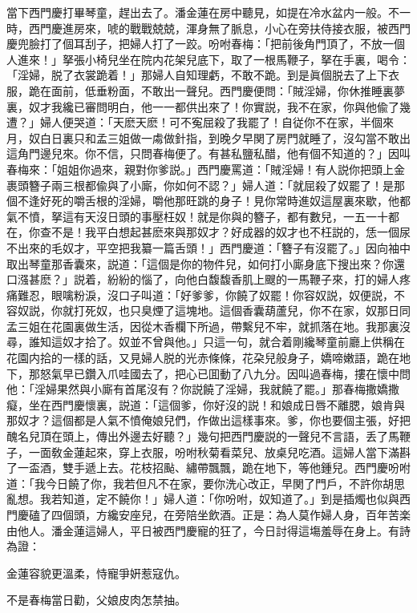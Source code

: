 當下西門慶打畢琴童，趕出去了。潘金蓮在房中聽見，如提在冷水盆内一般。不一時，西門慶進房來，唬的戰戰兢兢，渾身無了脈息，小心在旁扶侍接衣服，被西門慶兜臉打了個耳刮子，把婦人打了一跤。吩咐春梅：「把前後角門頂了，不放一個人進來！」拏張小椅兒坐在院内花架兒底下，取了一根馬鞭子，拏在手裏，喝令：「淫婦，脱了衣裳跪着！」那婦人自知理虧，不敢不跪。到是眞個脱去了上下衣服，跪在面前，低垂粉面，不敢出一聲兒。西門慶便問：「賊淫婦，你休推睡裏夢裏，奴才我纔已審問明白，他一一都供出來了！你實説，我不在家，你與他偸了幾遭？」婦人便哭道：「天麽天麽！可不寃屈殺了我罷了！自従你不在家，半個來月，奴白日裏只和孟三姐做一䖏做針指，到晚夕早関了房門就睡了，沒勾當不敢出這角門邊兒來。你不信，只問春梅便了。有甚私鹽私醋，他有個不知道的？」因叫春梅來：「姐姐你過來，親對你爹説。」西門慶罵道：「賊淫婦！有人説你把頭上金裹頭簪子兩三根都偸與了小廝，你如何不認？」婦人道：「就屈殺了奴罷了！是那個不逢好死的嚼舌根的淫婦，嚼他那旺跳的身子！見你常時進奴這屋裏來歇，他都氣不憤，拏這有天沒日頭的事壓枉奴！就是你與的簪子，都有數兒，一五一十都在，你查不是！我平白想起甚麽來與那奴才？好成器的奴才也不枉説的，恁一個尿不出來的毛奴才，平空把我纂一篇舌頭！」西門慶道：「簪子有沒罷了。」因向袖中取出琴童那香囊來，説道：「這個是你的物件兒，如何打小廝身底下搜出來？你還口漒甚麽？」説着，紛紛的惱了，向他白馥馥香肌上颼的一馬鞭子來，打的婦人疼痛難忍，眼噙粉淚，沒口子叫道：「好爹爹，你饒了奴罷！你容奴説，奴便説，不容奴説，你就打死奴，也只臭煙了這塊地。這個香囊葫蘆兒，你不在家，奴那日同孟三姐在花園裏做生活，因從木香欄下所過，帶繫兒不牢，就抓落在地。我那裏沒尋，誰知這奴才拾了。奴並不曾與他。」只這一句，就合着剛纔琴童前廳上供稱在花園内拾的一樣的話，又見婦人脱的光赤條條，花朶兒般身子，嬌啼嫩語，跪在地下，那怒氣早已鑽入爪哇國去了，把心已囬動了八九分。因叫過春梅，摟在懷中問他：「淫婦果然與小廝有首尾沒有？你説饒了淫婦，我就饒了罷。」那春梅撒嬌撒癡，坐在西門慶懷裏，説道：「這個爹，你好沒的説！和娘成日唇不離腮，娘肯與那奴才？這個都是人氣不憤俺娘兒們，作做出這樣事來。爹，你也要個主張，好把醜名兒頂在頭上，傳出外邊去好聽？」幾句把西門慶説的一聲兒不言語，丢了馬鞭子，一面敎金蓮起來，穿上衣服，吩咐秋菊看菜兒、放桌兒吃酒。這婦人當下滿斟了一盃酒，雙手遞上去。花枝招颭、繡帶飄飄，跪在地下，等他鍾兒。西門慶吩咐道：「我今日饒了你，我若但凡不在家，要你洗心改正，早関了門戶，不許你胡思亂想。我若知道，定不饒你！」婦人道：「你吩咐，奴知道了。」到是插燭也似與西門慶磕了四個頭，方纔安座兒，在旁陪坐飲酒。正是：為人莫作婦人身，百年苦楽由他人。潘金蓮這婦人，平日被西門慶寵的狂了，今日討得這塲羞辱在身上。有詩為證：

\begin{myquote}
金蓮容貌更溫柔，恃寵爭姸惹寇仇。

不是春梅當日勸，父娘皮肉怎禁抽。
\end{myquote}

